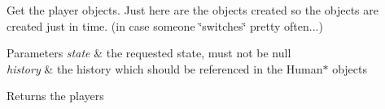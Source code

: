 Get the player objects. Just here are the objects created so the objects are created just in time. (in case someone \char`\"{}switches\char`\"{} pretty often...) 


\begin{DoxyParams}{Parameters}
{\em state} & the requested state, must not be {\ttfamily null} \\
\hline
{\em history} & the history which should be referenced in the Human$\ast$ objects \\
\hline
\end{DoxyParams}
\begin{DoxyReturn}{Returns}
the players 
\end{DoxyReturn}
